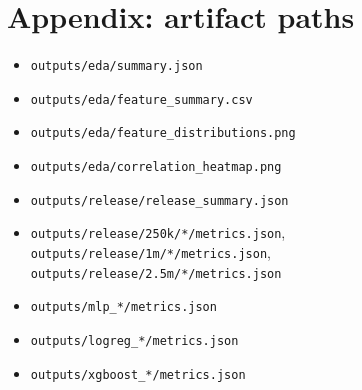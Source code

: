 \documentclass[11pt,a4paper,oneside]{report}
\begin{document}
\section{Appendix: artifact paths}

\begin{itemize}
\item \texttt{outputs/eda/summary.json}
\item \texttt{outputs/eda/feature\_summary.csv}
\item \texttt{outputs/eda/feature\_distributions.png}
\item \texttt{outputs/eda/correlation\_heatmap.png}
\item \texttt{outputs/release/release\_summary.json}
\item \texttt{outputs/release/250k/*/metrics.json}, \texttt{outputs/release/1m/*/metrics.json}, \texttt{outputs/release/2.5m/*/metrics.json}
\item \texttt{outputs/mlp\_*/metrics.json}
\item \texttt{outputs/logreg\_*/metrics.json}
\item \texttt{outputs/xgboost\_*/metrics.json}
\end{itemize}
\end{document}
